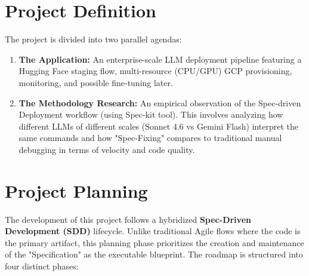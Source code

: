 \documentclass[a4paper,12pt]{report}
\begin{document}
\section{Project Definition}
The project is divided into two parallel agendas:
\begin{enumerate}
\item \textbf{The Application:} An enterprise-scale LLM deployment pipeline featuring a Hugging Face staging flow, multi-resource (CPU/GPU) GCP provisioning, monitoring, and possible fine-tuning later.
\item \textbf{The Methodology Research:} An empirical observation of the Spec-driven Deployment workflow (using Spec-kit tool). This involves analyzing how different LLMs of different scales (Sonnet 4.6 vs Gemini Flash) interpret the same commands and how "Spec-Fixing" compares to traditional manual debugging in terms of velocity and code quality.
\end{enumerate}

\section{Project Planning}
The development of this project follows a hybridized \textbf{Spec-Driven Development (SDD)} lifecycle. Unlike traditional Agile flows where the code is the primary artifact, this planning phase prioritizes the creation and maintenance of the "Specification" as the executable blueprint. The roadmap is structured into four distinct phases:
\end{document}
